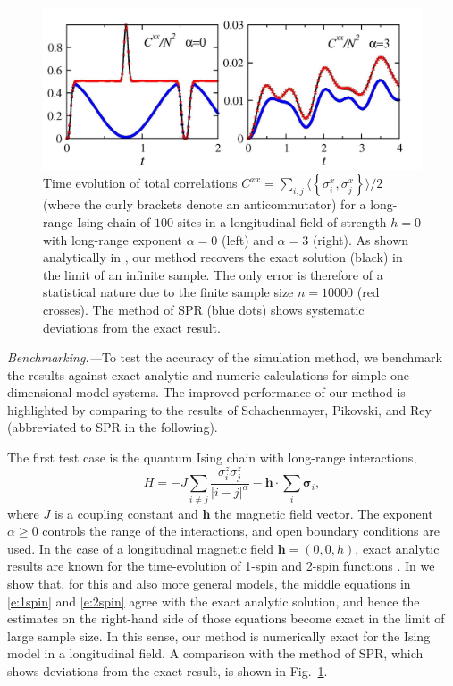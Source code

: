 \documentclass[aps,prl,showpacs,amsmath,amssymb,superscriptaddress,reprint,10pt]{revtex4-1}
\newcommand{\mvec}[1]{\boldsymbol #1}
\begin{document}
\begin{bibunit}
\begin{figure}\centering
\includegraphics[width=\linewidth]{./Ising_Schach_N100_alph_0_3_nt10000.jpg}
\caption{\label{f:Ising}%
Time evolution of total correlations $C^{xx}=\sum_{i,j}\langle\left\{\sigma_i^x,\sigma_j^x\right\}\rangle/2$ (where the curly brackets denote an anticommutator) for a long-range Ising chain of $100$ sites in a longitudinal field of strength $h=0$ with long-range exponent $\alpha=0$ (left) and $\alpha=3$ (right). As shown analytically in \cite{Note1}, our method recovers the exact solution (black) in the limit of an infinite sample. The only error is therefore of a statistical nature due to the finite sample size $n=10000$ (red crosses). The method of SPR (blue dots) shows systematic deviations from the exact result.
}%
\end{figure}


{\em Benchmarking.---}To test the accuracy of the simulation method, we benchmark the results against exact analytic and numeric calculations for simple one-dimensional model systems. The improved performance of our method is highlighted by comparing to the results of Schachenmayer, Pikovski, and Rey \cite{Schachenmayer_etal15} (abbreviated to SPR in the following).

The first test case is the quantum Ising chain with long-range interactions,
\begin{equation}\label{e:Ising}
H=-J\sum_{i\neq j}\frac{\sigma_i^z\sigma_j^z}{|i-j|^\alpha} - \mvec{h}\cdot\sum_i\mvec{\sigma}_i,
\end{equation}
where $J$ is a coupling constant and $\mvec{h}$ the magnetic field vector. The exponent $\alpha\geq0$ controls the range of the interactions, and open boundary conditions are used. In the case of a longitudinal magnetic field $\mvec{h}=(0,0,h)$, exact analytic results are known for the time-evolution of 1-spin \cite{Emch66,*Radin70,*Kastner11,*Kastner12} and 2-spin functions \cite{vdWorm_etal13,*FossFeigHazzardBollingerRey13,*KastnerVdWorm}. In \cite{Note1} we show that, for this and also more general models, the middle equations in \eqref{e:1spin} and \eqref{e:2spin} agree with the exact analytic solution, and hence the estimates on the right-hand side of those equations become exact in the limit of large sample size. In this sense, our method is numerically exact for the Ising model in a longitudinal field. A comparison with the method of SPR, which shows deviations from the exact result, is shown in Fig.~\ref{f:Ising}.


\end{bibunit}
\end{document}
